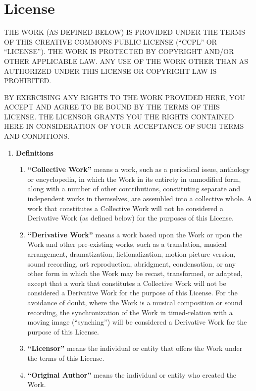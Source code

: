 \section{License}

{\sloppy
THE WORK (AS DEFINED BELOW) IS PROVIDED UNDER THE TERMS OF THIS
CREATIVE COMMONS PUBLIC LICENSE (``CCPL'' OR ``LICENSE''). THE WORK IS
PROTECTED BY COPYRIGHT AND/OR OTHER APPLICABLE LAW. ANY USE OF THE
WORK OTHER THAN AS AUTHORIZED UNDER THIS LICENSE OR COPYRIGHT LAW IS
PROHIBITED.

BY EXERCISING ANY RIGHTS TO THE WORK PROVIDED HERE, YOU ACCEPT AND
AGREE TO BE BOUND BY THE TERMS OF THIS LICENSE. THE LICENSOR GRANTS
YOU THE RIGHTS CONTAINED HERE IN CONSIDERATION OF YOUR ACCEPTANCE OF
SUCH TERMS AND CONDITIONS.}

\medbreak
\begin{enumerate}
\item \textbf{Definitions}

\begin{enumerate}
\item \textbf{``Collective Work''} means a work, such as a periodical
issue, anthology or encyclopedia, in which the Work in its entirety in
unmodified form, along with a number of other contributions,
constituting separate and independent works in themselves, are
assembled into a collective whole. A work that constitutes a
Collective Work will not be considered a Derivative Work (as defined
below) for the purposes of this License.

\item \textbf{``Derivative Work''} means a work based upon the Work or
upon the Work and other pre-existing works, such as a translation,
musical arrangement, dramatization, fictionalization, motion picture
version, sound recording, art reproduction, abridgment, condensation,
or any other form in which the Work may be recast, transformed, or
adapted, except that a work that constitutes a Collective Work will
not be considered a Derivative Work for the purpose of this
License. For the avoidance of doubt, where the Work is a musical
composition or sound recording, the synchronization of the Work in
timed-relation with a moving image (``synching'') will be considered a
Derivative Work for the purpose of this License.

\item \textbf{``Licensor''} means the individual or entity that offers
the Work under the terms of this License.

\item \textbf{``Original Author''} means the individual or entity who
created the Work.


\end{enumerate}
\end{enumerate}
